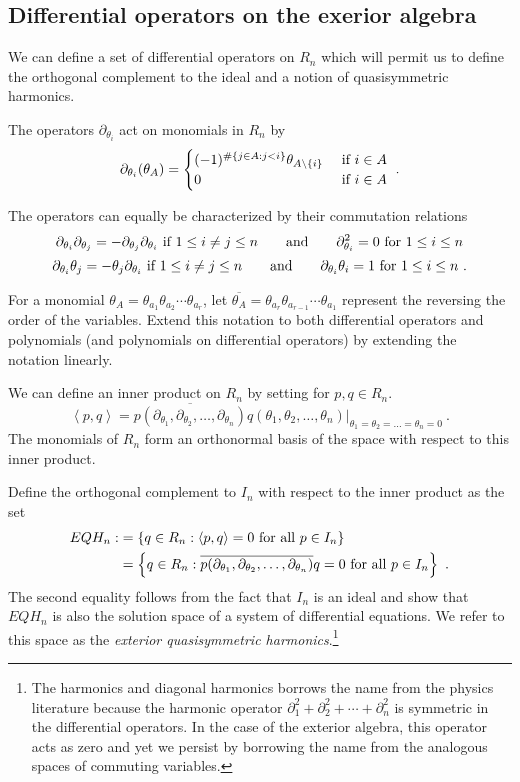 \documentclass[11pt]{amsart}
\theoremstyle{definition}
\numberwithin{equation}{section}
\begin{document}
\subsection{Differential operators on the exerior algebra}
We can define a set of differential operators on $R_n$ which
will permit us to define the orthogonal complement to the
ideal and a notion of quasisymmetric harmonics.

The operators $\partial_{\theta_i}$ act on monomials in $R_n$
by
\[
\partial_{\theta_i}( \theta_A ) = \begin{cases}
(-1)^{\#\{ j \in A: j<i\}}\theta_{A \backslash \{i\}}&\hbox{ if }i \in A\\
0&\hbox{ if }i \in A
\end{cases}~.
\]

The operators can equally be characterized by their commutation
relations
\[
\partial_{\theta_i} \partial_{\theta_j}=-\partial_{\theta_j} \partial_{\theta_i}
\hbox{ if } 1 \leq i \neq j \leq n
\qquad\hbox{and}\qquad
\partial_{\theta_i}^2 = 0\hbox{ for }1 \leq i \leq n
\]
\[
\partial_{\theta_i} \theta_j=-\theta_j \partial_{\theta_i}
\hbox{ if } 1 \leq i \neq j \leq n
\qquad\hbox{and}\qquad
\partial_{\theta_i} \theta_i = 1\hbox{ for }1 \leq i \leq n~.
\]

For a monomial $\theta_A = \theta_{a_1} \theta_{a_2} \cdots \theta_{a_r}$,
let $\overline{\theta_A} = \theta_{a_r} \theta_{a_{r-1}} \cdots \theta_{a_1}$ represent the
reversing the order of the variables.  Extend this notation to both
differential operators and polynomials (and polynomials on differential operators)
by extending the notation linearly.

We can define an inner product on $R_n$ by setting for $p,q \in R_n$.
\[
\left< p, q \right> = \overline{p(\partial_{\theta_1}, \partial_{\theta_2}, \ldots, \partial_{\theta_n})}
q( \theta_1, \theta_2, \ldots, \theta_n)|_{\theta_1=\theta_2 = \ldots=\theta_n=0}~.
\]
The monomials of $R_n$ form an orthonormal basis of the space with respect to this
inner product.

Define the orthogonal complement to $I_n$ with respect to the inner product as
the set
\begin{align*}
EQH_n :&= \left\{ q \in R_n : \left< p, q \right> = 0 \hbox{ for all } p \in I_n \right\}\\
  &=\left\{ q \in R_n :\overline{p(\partial_{\theta_1}, \partial_{\theta_2}, \ldots, \partial_{\theta_n})}
q= 0 \hbox{ for all } p \in I_n \right\}~.
\end{align*}
The second equality follows from the fact that $I_n$ is an ideal and show that $EQH_n$ is also the solution space of 
a system of differential equations. We refer to this space as the \emph{exterior quasisymmetric harmonics}.\footnote{
The harmonics and diagonal harmonics borrows the name from the physics literature
because the harmonic operator $\partial_1^2 + \partial_2^2 + \cdots + \partial_n^2$
is symmetric in the differential operators.  In the case of the exterior algebra,
this operator acts as zero and yet we persist by borrowing the name from the
analogous spaces of commuting variables.
}
\end{document}
